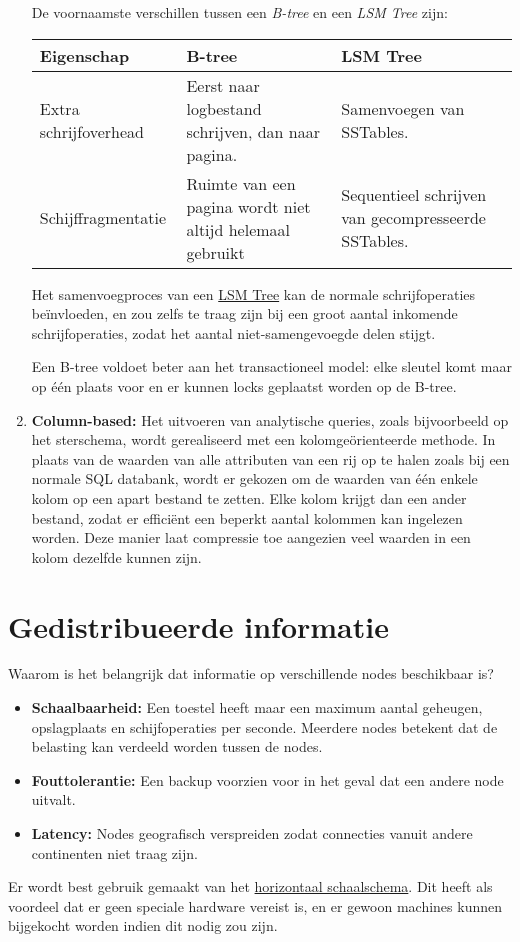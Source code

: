 \begin{enumerate}
        De voornaamste verschillen tussen een \emph{B-tree} en een \emph{LSM Tree} zijn:
        \begin{table}[ht]
            \centering
            \begin{tabular}{| l | p{} | p{}}
                Eigenschap & B-tree & LSM Tree \\
                \hline
                Extra schrijfoverhead & Eerst naar logbestand schrijven, dan naar pagina. & Samenvoegen van SSTables. \\
                \hline
                Schijffragmentatie & Ruimte van een pagina wordt niet altijd helemaal gebruikt & Sequentieel schrijven van gecompresseerde SSTables. \\
            \end{tabular}
        \end{table}
        Het samenvoegproces van een \underline{LSM Tree} kan de normale schrijfoperaties beïnvloeden, en zou zelfs te traag zijn bij een groot aantal inkomende schrijfoperaties, zodat het aantal niet-samengevoegde delen stijgt.

        Een B-tree voldoet beter aan het transactioneel model: elke sleutel komt maar op één plaats voor en er kunnen locks geplaatst worden op de B-tree.

        \item[\info] \textbf{Column-based:} Het uitvoeren van analytische queries, zoals bijvoorbeeld op het sterschema, wordt gerealiseerd met een kolomgeörienteerde methode. In plaats van de waarden van alle attributen van een rij op te halen zoals bij een normale SQL databank, wordt er gekozen om de waarden van één enkele kolom op een apart bestand te zetten. Elke kolom krijgt dan een ander bestand, zodat er efficiënt een beperkt aantal kolommen kan ingelezen worden. Deze manier laat compressie toe aangezien veel waarden in een kolom dezelfde kunnen zijn. 
    \end{enumerate}
    
    



	\chapter{Gedistribueerde informatie}
	Waarom is het belangrijk dat informatie op verschillende nodes beschikbaar is?
	\begin{itemize}
		\item[\info]\textbf{Schaalbaarheid:} Een toestel heeft maar een maximum aantal geheugen, opslagplaats en schijfoperaties per seconde. Meerdere nodes betekent dat de belasting kan verdeeld worden tussen de nodes.
		\item[\info]\textbf{Fouttolerantie:} Een backup voorzien voor in het geval dat een andere node uitvalt.
		\item[\info]\textbf{Latency:} Nodes geografisch verspreiden zodat connecties vanuit andere continenten niet traag zijn.
	\end{itemize}
	Er wordt best gebruik gemaakt van het \underline{horizontaal schaalschema}. Dit heeft als voordeel dat er geen speciale hardware vereist is, en er gewoon machines kunnen bijgekocht worden indien dit nodig zou zijn.

